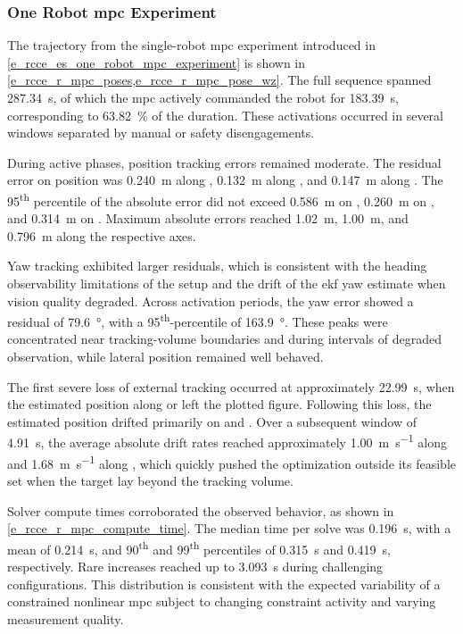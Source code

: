 \subsubsection{One Robot \acs{mpc} Experiment} \label{e_rcce_r_single_bluerov_mpc_experiment}

The trajectory from the single-robot \ac{mpc} experiment introduced in
\cref{e_rcce_es_one_robot_mpc_experiment} is shown in
\cref{e_rcce_r_mpc_poses,e_rcce_r_mpc_pose_wz}. The full sequence spanned \qty{287.34}{\s}, of
which the \ac{mpc} actively commanded the robot for \qty{183.39}{\s}, corresponding to
\qty{63.82}{\percent} of the duration. These activations occurred in several windows separated by
manual or safety disengagements.

During active phases, position tracking errors remained moderate. The residual error on position
was \qty{0.240}{\m} along , \qty{0.132}{\m} along , and \qty{0.147}{\m}
along . The \num{95}\textsuperscript{th} percentile of the absolute error did not
exceed \qty{0.586}{\m} on , \qty{0.260}{\m} on , and \qty{0.314}{\m} on
. Maximum absolute errors reached \qty{1.02}{\m}, \qty{1.00}{\m}, and \qty{0.796}{\m}
along the respective axes.

Yaw tracking exhibited larger residuals, which is consistent with the heading observability
limitations of the setup and the drift of the \ac{ekf} yaw estimate when vision quality degraded.
Across activation periods, the yaw error showed a residual of \qty{79.6}{\degree}, with a
\num{95}\textsuperscript{th}-percentile of \qty{163.9}{\degree}. These peaks were concentrated near
tracking-volume boundaries and during intervals of degraded observation, while lateral position
remained well behaved.

The first severe loss of external tracking occurred at approximately \qty{22.99}{\s}, when the
estimated position along  or  left the plotted figure. Following this loss,
the estimated position drifted primarily on  and . Over a subsequent window
of \qty{4.91}{\s}, the average absolute drift rates reached approximately \qty{1.00}{\m\per\s}
along  and \qty{1.68}{\m\per\s} along , which quickly pushed the
optimization outside its feasible set when the target lay beyond the tracking volume.

Solver compute times corroborated the observed behavior, as shown in
\cref{e_rcce_r_mpc_compute_time}. The median time per solve was \qty{0.196}{\s}, with a mean of
\qty{0.214}{\s}, and \num{90}\textsuperscript{th} and \num{99}\textsuperscript{th} percentiles of
\qty{0.315}{\s} and \qty{0.419}{\s}, respectively. Rare increases reached up to \qty{3.093}{\s}
during challenging configurations. This distribution is consistent with the expected variability of
a constrained nonlinear \ac{mpc} subject to changing constraint activity and varying measurement
quality.

